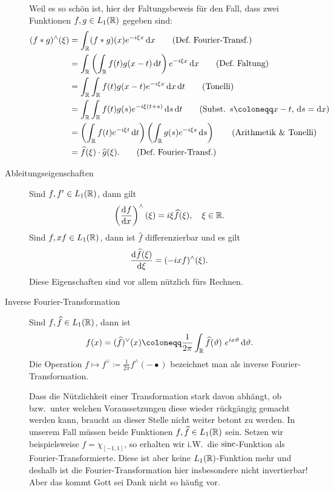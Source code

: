 \begin{remark}
\begin{description}
    Weil es so schön ist, hier der Faltungsbeweis für den Fall, dass zwei Funktionen
    $ f,g \in L_{1}(\mathbb{R}) $ gegeben sind:
    \begin{align}
       (f * g)^{\wedge}(\xi)
    &= \int_{\R} (f * g)(x) e^{-i\xi x} \dif x \tag{Def.\ Fourier-Transf.} \\
    &= \int_{\R} \left( \int_{\R} f(t) g(x - t) \dif t \right) e^{-i\xi x} \dif x 
        \tag{Def.\ Faltung} \\
    &= \int_{\R} \int_{\R} f(t) g(x - t)  e^{-i\xi x} \dif x \dif t
        \tag{Tonelli} \\
     &= \int_{\R} \int_{\R} f(t) g(s)  e^{-i\xi (t + s)} \dif s \dif t
            \tag{Subst. $ s \coloneqq x - t $, $ \dif s = \dif x $} \\
    &= \left( \int_{\R} f(t) e^{-i\xi t} \dif t \right)
       \left( \int_{\R} g(s) e^{-i\xi s} \dif s \right) \tag{Arithmetik \& Tonelli} \\
    &= \widehat{f}(\xi) \cdot \widehat{g}(\xi). \tag{Def.\ Fourier-Transf.}
    \end{align}

		\item [Ableitungseigenschaften] Sind $ f, f' \in L_{1}(\mathbb{R}) $, dann gilt
    \[
      \left( \dod{f}{x} \right)^{\wedge}(\xi) = i\xi \widehat{f}(\xi), \quad \xi \in \R.
    \]
    Sind $ f, xf \in L_{1}(\mathbb{R}) $, dann ist $ \widehat{f} $ differenzierbar und es gilt
    \[
      \dod{\widehat{f}(\xi)}{\xi} = (-ix f)^{\wedge}(\xi).
    \]
    Diese Eigenschaften sind vor allem nützlich fürs Rechnen.
    
		\item [Inverse Fourier-Transformation] Sind $ f, \widehat{f} \in L_{1}(\mathbb{R}) $, dann ist
		\[
  		f(x) = (\widehat{f})^{\vee}(x) \coloneqq 
    		\frac{1}{2\pi} \int_{\R} \widehat{f}(\vartheta) \ e^{i x \vartheta} \dif \vartheta.
		\]
		Die Operation $ f \mapsto f^{\vee} \coloneqq \frac{1}{2\pi} f^{\wedge}(-\bullet) $ bezeichnet
		man als inverse Fourier-Transformation. 
		
		Dass die Nützlichkeit einer Transformation stark
		davon abhängt, ob bzw.\ unter welchen Voraussetzungen diese wieder rückgängig gemacht werden 
		kann, braucht an dieser Stelle nicht weiter betont zu werden. In unserem Fall müssen beide
		Funktionen $ f, \widehat{f} \in L_{1}(\mathbb{R}) $ sein. Setzen wir beispielsweise
		$ f = \chi_{[-1,1]} $, so erhalten wir i.W.\ die $ \operatorname{sinc} $-Funktion als Fourier-Transformierte.
		Diese ist aber keine $ L_{1}(\mathbb{R}) $-Funktion mehr und deshalb ist die Fourier-Transformation hier
		insbesondere nicht invertierbar! Aber das kommt Gott sei Dank nicht so häufig vor.
		

\end{description}
\end{remark}
